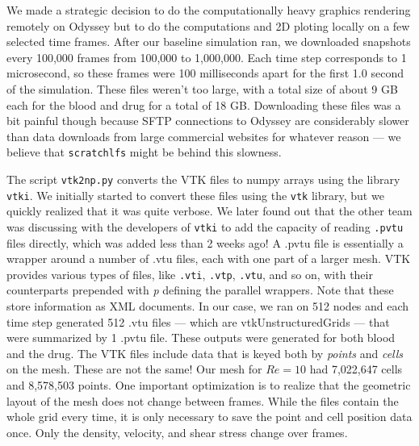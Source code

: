 \documentclass[11pt]{article} %
\newcommand{\tty}[1]{\texttt{#1}}
\begin{document}
We made a strategic decision to do the computationally heavy graphics rendering remotely on Odyssey
but to do the computations and 2D ploting locally on a few selected time frames.
After our baseline simulation ran, we downloaded snapshots every 100,000 frames from 100,000 to 1,000,000.
Each time step corresponds to 1 microsecond, so these frames were 100 milliseconds apart for
the first 1.0 second of the simulation.  
These files weren't too large, with a total size of about 9 GB each for the blood and drug for a total of 18 GB.
Downloading these files was a bit painful though because SFTP connections to Odyssey 
are considerably slower than data downloads from large commercial websites for whatever reason --- 
we believe that \tty{scratchlfs} might be behind this slowness.

The script \tty{vtk2np.py} converts the VTK files to numpy arrays using the library \tty{vtki}. We initially started to convert these files using the \tty{vtk} library, but we quickly realized that it was quite verbose. We later found out that the other team was discussing with the developers of \tty{vtki} to add the capacity of reading \tty{.pvtu} files directly, which was added less than 2 weeks ago! A .pvtu file is essentially a wrapper around a number of .vtu files, each with one part of a larger mesh. VTK provides various types of files, like \tty{.vti}, \tty{.vtp}, \tty{.vtu}, and so on, with their counterparts prepended with \textit{p} defining the parallel wrappers. Note that these store information as XML documents.
In our case, we ran on 512 nodes and each time step generated 512 .vtu files --- which are vtkUnstructuredGrids --- that were summarized by 1 .pvtu file.  
These outputs were generated for both blood and the drug.
The VTK files include data that is keyed both by \textit{points} and \textit{cells} on the mesh.
These are not the same! Our mesh for $Re=10$ had 7,022,647 cells and 8,578,503 points.
One important optimization is to realize that the geometric layout of the mesh does not change between frames.  
While the files contain the whole grid every time, it is only necessary to save the point and cell position data once.  
Only the density, velocity, and shear stress change over frames.
\end{document}

